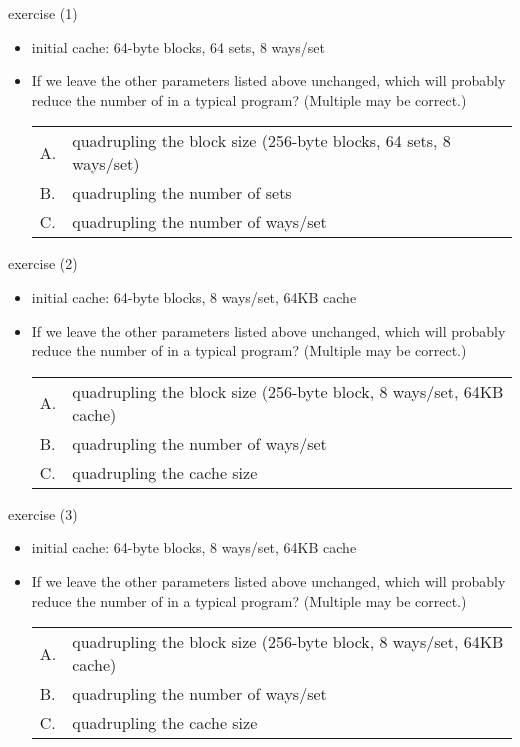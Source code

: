 \begin{frame}{exercise (1)}
    \begin{itemize}
    \item initial cache: 64-byte blocks, 64 sets, 8 ways/set
    \vspace{.5cm}
\item If we leave the other parameters listed above unchanged, which will probably reduce
    the number of  in a typical program? 
    (Multiple may be correct.) \\
    \begin{tabular}{ll}
        A. & quadrupling  the block size {\small (256-byte blocks, 64 sets, 8 ways/set)}\\
        B. & quadrupling the number of sets \\
        C. & quadrupling the number of ways/set\\
    \end{tabular}
    \end{itemize}
\end{frame}

\begin{frame}{exercise (2)}
    \begin{itemize}
    \item initial cache: 64-byte blocks, 8 ways/set, 64KB cache
    \vspace{.5cm}
    \item If we leave the other parameters listed above unchanged, which will probably reduce
          the number of  in a typical program? (Multiple may be correct.) \\
    \begin{tabular}{ll}
        A. & quadrupling the block size {\small (256-byte block, 8 ways/set, 64KB cache)}\\
        B. & quadrupling the number of ways/set \\
        C. & quadrupling the cache size \\
    \end{tabular}
    \end{itemize}
\end{frame}

\begin{frame}{exercise (3)}
    \begin{itemize}
    \item initial cache: 64-byte blocks, 8 ways/set, 64KB cache
    \vspace{.5cm}
    \item If we leave the other parameters listed above unchanged, which will probably reduce
          the number of  in a typical program? (Multiple may be correct.) \\
    \begin{tabular}{ll}
        A. & quadrupling the block size {\small (256-byte block, 8 ways/set, 64KB cache)}\\
        B. & quadrupling the number of ways/set \\
        C. & quadrupling the cache size \\
    \end{tabular}
    \end{itemize}
\end{frame}

